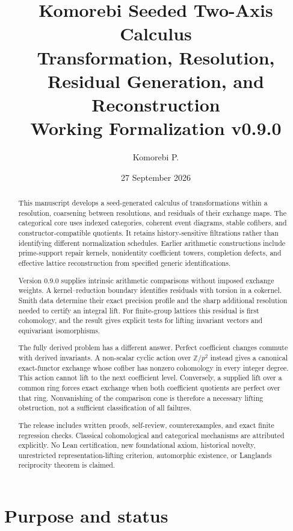 \documentclass[11pt]{article}
\title{\textbf{Komorebi Seeded Two-Axis Calculus}\\
\large Transformation, Resolution, Residual Generation, and Reconstruction\\[0.4em]
\normalsize Working Formalization v0.9.0}
\author{Komorebi P.}
\date{27 September 2026}
\theoremstyle{definition}
\theoremstyle{remark}
\begin{document}
\maketitle

\begin{abstract}
This manuscript develops a seed-generated calculus of transformations within a resolution, coarsening between resolutions, and residuals of their exchange maps. The categorical core uses indexed categories, coherent event diagrams, stable cofibers, and constructor-compatible quotients. It retains history-sensitive filtrations rather than identifying different normalization schedules. Earlier arithmetic constructions include prime-support repair kernels, nonidentity coefficient towers, completion defects, and effective lattice reconstruction from specified generic identifications.

Version 0.9.0 supplies intrinsic arithmetic comparisons without imposed exchange weights. A kernel--reduction boundary identifies residuals with torsion in a cokernel. Smith data determine their exact precision profile and the sharp additional resolution needed to certify an integral lift. For finite-group lattices this residual is first cohomology, and the result gives explicit tests for lifting invariant vectors and equivariant isomorphisms.

The fully derived problem has a different answer. Perfect coefficient changes commute with derived invariants. A non-scalar cyclic action over $\mathbb Z/p^2$ instead gives a canonical exact-functor exchange whose cofiber has nonzero cohomology in every integer degree. This action cannot lift to the next coefficient level. Conversely, a supplied lift over a common ring forces exact exchange when both coefficient quotients are perfect over that ring. Nonvanishing of the comparison cone is therefore a necessary lifting obstruction, not a sufficient classification of all failures.

The release includes written proofs, self-review, counterexamples, and exact finite regression checks. Classical cohomological and categorical mechanisms are attributed explicitly. No Lean certification, new foundational axiom, historical novelty, unrestricted representation-lifting criterion, automorphic existence, or Langlands reciprocity theorem is claimed.
\end{abstract}
\newpage

\begingroup\small\tableofcontents\endgroup
\newpage

\section{Purpose and status}
\end{document}
